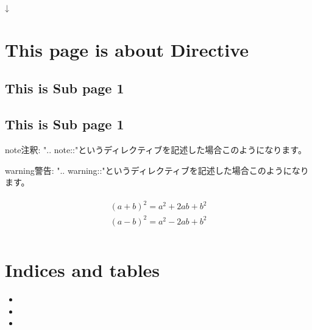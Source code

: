 \documentclass[letterpaper,10pt,dvipdfmx,openany,oneside]{sphinxmanual}
\begin{document}
\begin{sphinxVerbatim}[commandchars=\\\{\}]
  
     
    
\end{sphinxVerbatim}

↓



\chapter{This page is about Directive}
\label{\detokenize{2.chapter/directive:this-page-is-about-directive}}\label{\detokenize{2.chapter/directive::doc}}

\section{This is Sub page 1}
\label{\detokenize{2.chapter/subpage/sub1:this-is-sub-page-1}}\label{\detokenize{2.chapter/subpage/sub1::doc}}

\section{This is Sub page 1}
\label{\detokenize{2.chapter/subpage/sub2:this-is-sub-page-1}}\label{\detokenize{2.chapter/subpage/sub2::doc}}
\begin{sphinxadmonition}{note}{注釈:}
".. note::"というディレクティブを記述した場合このようになります。
\end{sphinxadmonition}

\begin{sphinxadmonition}{warning}{警告:}
".. warning::"というディレクティブを記述した場合このようになります。
\end{sphinxadmonition}
\begin{align*}\!\begin{aligned}
(a + b)^2 = a^2 + 2ab + b^2\\
(a - b)^2 = a^2 - 2ab + b^2\\
\end{aligned}\end{align*}

\chapter{Indices and tables}
\label{\detokenize{index:indices-and-tables}}\begin{itemize}
\item {} 

\item {} 

\item {} 

\end{itemize}



\renewcommand{\indexname}{索引}
\printindex
\end{document}

